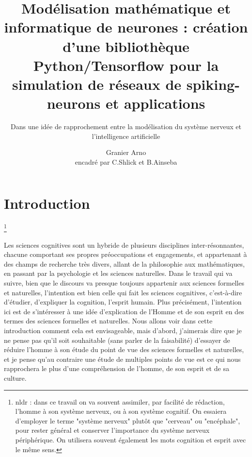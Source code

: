 \documentclass[12pt]{scrartcl}
\title{Modélisation mathématique et informatique de neurones : création d'une bibliothèque Python/Tensorflow pour la simulation de réseaux de spiking-neurons et applications }
\subtitle{Dans une idée de rapprochement entre la modélisation du système nerveux et l'intelligence artificielle}
\author{Granier Arno \\ encadré par C.Shlick et B.Ainseba}
\newcommand\blfootnote[1]{%
\begingroup
\renewcommand\thefootnote{}\footnote{#1}%
\addtocounter{footnote}{-1}%
\endgroup
}
\begin{document}
\maketitle

\tableofcontents

\pagebreak


\part{Introduction}
\blfootnote{nldr : dans ce travail on va souvent assimiler, par facilité de rédaction, l'homme à son système nerveux, ou à son système cognitif. On essaiera d'employer le terme "système nerveux" plutôt que "cerveau" ou "encéphale", pour rester général et conserver l'importance du système nerveux périphérique. On utilisera souvent également les mots cognition et esprit avec le même sens.}

Les sciences cognitives sont un hybride de plusieurs disciplines inter-résonnantes, chacune comportant ses propres préoccupations et engagements, et appartenant à des champs de recherche très divers, allant de la philosophie aux mathématiques, en passant par la psychologie et les sciences naturelles. Dans le travail qui va suivre, bien que le discours va presque toujours appartenir aux sciences formelles et naturelles, l'intention est bien celle qui fait les sciences cognitives, c'est-à-dire d'étudier, d'expliquer la cognition, l'esprit humain. Plus précisément, l'intention ici est de s'intéresser à une idée d'explication de l'Homme et de son esprit en des termes des sciences formelles et naturelles. Nous allons voir dans cette introduction comment cela est envisageable, mais d'abord, j'aimerais dire que je ne pense pas qu'il soit souhaitable (sans parler de la faisabilité) d'essayer de réduire l'homme à son étude du point de vue des sciences formelles et naturelles, et je pense qu'au contraire une étude de multiples points de vue est ce qui nous rapprochera le plus d'une compréhension de l'homme, de son esprit et de sa culture.\\
\end{document}
